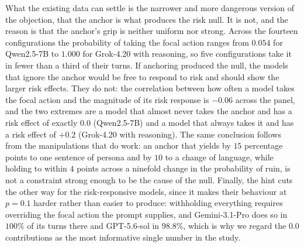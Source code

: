 \documentclass[openacc]{rsproca_new}
\begin{document}
What the existing data can settle is the narrower and more dangerous version of the objection, that the anchor is what produces the risk null. It is not, and the reason is that the anchor's grip is neither uniform nor strong. Across the fourteen configurations the probability of taking the focal action ranges from $0.054$ for Qwen2.5-7B to $1.000$ for Grok-4.20 with reasoning, so five configurations take it in fewer than a third of their turns. If anchoring produced the null, the models that ignore the anchor would be free to respond to risk and should show the larger risk effects. They do not: the correlation between how often a model takes the focal action and the magnitude of its risk response is $-0.06$ across the panel, and the two extremes are a model that almost never takes the anchor and has a risk effect of exactly $0.0$ (Qwen2.5-7B) and a model that always takes it and has a risk effect of $+0.2$ (Grok-4.20 with reasoning). The same conclusion follows from the manipulations that do work: an anchor that yields by $15$ percentage points to one sentence of persona and by $10$ to a change of language, while holding to within $4$ points across a ninefold change in the probability of ruin, is not a constraint strong enough to be the cause of the null. Finally, the hint cuts the other way for the risk-responsive models, since it makes their behaviour at $p=0.1$ harder rather than easier to produce: withholding everything requires overriding the focal action the prompt supplies, and Gemini-3.1-Pro does so in $100\%$ of its turns there and GPT-5.6-sol in $98.8\%$, which is why we regard the $0.0$ contributions as the most informative single number in the study.
\end{document}
